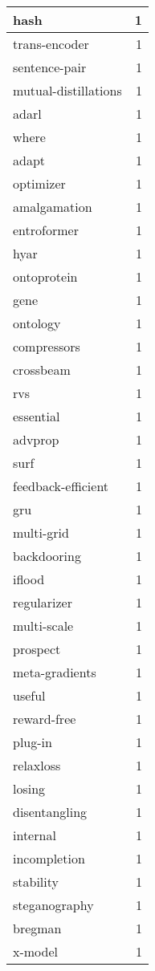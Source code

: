 \begin{table}[h]
\begin{tabular}{|l|r|}
\hline
hash & 1 \\
\hline
trans-encoder & 1 \\
\hline
sentence-pair & 1 \\
\hline
mutual-distillations & 1 \\
\hline
adarl & 1 \\
\hline
where & 1 \\
\hline
adapt & 1 \\
\hline
optimizer & 1 \\
\hline
amalgamation & 1 \\
\hline
entroformer & 1 \\
\hline
hyar & 1 \\
\hline
ontoprotein & 1 \\
\hline
gene & 1 \\
\hline
ontology & 1 \\
\hline
compressors & 1 \\
\hline
crossbeam & 1 \\
\hline
rvs & 1 \\
\hline
essential & 1 \\
\hline
advprop & 1 \\
\hline
surf & 1 \\
\hline
feedback-efficient & 1 \\
\hline
gru & 1 \\
\hline
multi-grid & 1 \\
\hline
backdooring & 1 \\
\hline
iflood & 1 \\
\hline
regularizer & 1 \\
\hline
multi-scale & 1 \\
\hline
prospect & 1 \\
\hline
meta-gradients & 1 \\
\hline
useful & 1 \\
\hline
reward-free & 1 \\
\hline
plug-in & 1 \\
\hline
relaxloss & 1 \\
\hline
losing & 1 \\
\hline
disentangling & 1 \\
\hline
internal & 1 \\
\hline
incompletion & 1 \\
\hline
stability & 1 \\
\hline
steganography & 1 \\
\hline
bregman & 1 \\
\hline
x-model & 1 \\

\end{tabular}
\end{table}
